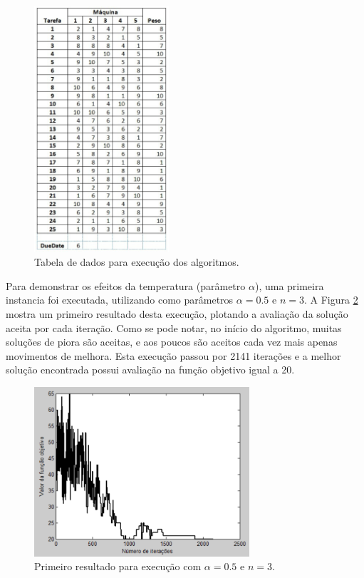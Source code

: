 \documentclass[conference]{IEEEtran}
\begin{document}
	\begin{figure}[h]
		\centering
		\includegraphics[width=5cm]{img/tabela-dados.png}
		\caption{Tabela de dados para execução dos algoritmos.}
		\label{fig:tabela-dados}
	\end{figure}

Para demonstrar os efeitos da temperatura (parâmetro $\alpha$), uma primeira instancia foi executada, utilizando como parâmetros $\alpha = 0.5$ e $n = 3$. A Figura \ref{fig:result-1} mostra um primeiro resultado desta execução, plotando a avaliação da solução aceita por cada iteração. Como se pode notar, no início do algoritmo, muitas soluções de piora são aceitas, e aos poucos são aceitos cada vez mais apenas movimentos de melhora. Esta execução passou por 2141 iterações e a melhor solução encontrada possui avaliação na função objetivo igual a 20.

	\begin{figure}[h]
		\centering
		\includegraphics[width=8cm]{img/result-1.png}
		\caption{Primeiro resultado para execução com $\alpha = 0.5$ e $n = 3$.}
		\label{fig:result-1}
	\end{figure}
\end{document}

